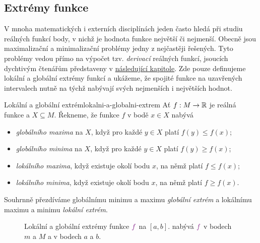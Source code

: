 \subsection{Extrémy funkce}
\label{ssec:extremy-funkce}

V mnoha matematických i externích disciplínách jeden často hledá při studiu
reálných funkcí body, v nichž je hodnota funkce největší či nejmenší. Obecně
jsou maximalizační a minimalizační problémy jedny z nejčastěji řešených. Tyto
problémy vedou přímo na výpočet tzv. \emph{derivací} reálných funkcí, jsoucích
dychtivým čtenářům představeny v \hyperref[chap:derivace]{následující kapitole}.
Zde pouze definujeme lokální a globální extrémy funkcí a ukážeme, že spojité
funkce na uzavřených intervalech nutně na týchž nabývají svých nejmenších i
největších hodnot.

\begin{definition}{Lokální a globální extrém}{lokalni-a-globalni-extrem}
 Ať $f:M \to \mathbb{R}$ je reálná funkce a $X \subseteq M$. Řekneme, že funkce $f$ v
 bodě $x \in X$ nabývá
 \begin{itemize}
  \item \emph{globálního maxima} na $X$, když pro každé $y \in X$ platí
   $f(y) \leq f(x)$;
  \item \emph{globálního minima} na $X$, když pro každé $y \in X$ platí $f(y)
   \geq f(x)$;
  \item \emph{lokálního maxima}, když existuje okolí bodu $x$, na němž platí $f
   \leq f(x)$;
  \item \emph{lokálního minima}, když existuje okolí bodu $x$, na němž platí $f
   \geq f(x)$.
 \end{itemize}
 Souhrnně přezdíváme globálnímu minimu a maximu \emph{globální extrém} a
 lokálnímu maximu a minimu \emph{lokální extrém}.
\end{definition}

\begin{figure}[ht]
 \centering
 \caption{Lokální a globální extrémy funkce $\clm{f}$ na $[a,b]$.  nabývá $\clm{f}$ v bodech $m$ a $M$ a  v
  bodech $a$ a $b$.}
 \label{fig:extremy}
\end{figure}


